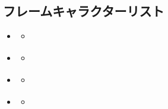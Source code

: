 \documentclass[letterpaper,10pt,dvipdfmx]{sphinxmanual}
\begin{document}
\subsection{フレームキャラクターリスト}
\label{\detokenize{auto/frameActionlist:characterlist-act-frame}}\label{\detokenize{auto/frameActionlist:id85}}
\begin{sphinxShadowBox}
\begin{itemize}
\item {} 
\sphinxAtStartPar
{}\label{\detokenize{auto/frameActionlist:id256}}{\hyperref[\detokenize{auto/frameActionlist:id87}]{}}
\begin{itemize}
\item {} 
\sphinxAtStartPar
{}\label{\detokenize{auto/frameActionlist:id257}}{\hyperref[\detokenize{auto/frameActionlist:char-reanimator}]{}}

\end{itemize}

\item {} 
\sphinxAtStartPar
{}\label{\detokenize{auto/frameActionlist:id258}}{\hyperref[\detokenize{auto/frameActionlist:id89}]{}}
\begin{itemize}
\item {} 
\sphinxAtStartPar
{}\label{\detokenize{auto/frameActionlist:id259}}{\hyperref[\detokenize{auto/frameActionlist:char-darklord}]{}}

\end{itemize}

\item {} 
\sphinxAtStartPar
{}\label{\detokenize{auto/frameActionlist:id260}}{\hyperref[\detokenize{auto/frameActionlist:id91}]{}}
\begin{itemize}
\item {} 
\sphinxAtStartPar
{}\label{\detokenize{auto/frameActionlist:id261}}{\hyperref[\detokenize{auto/frameActionlist:char-chariot}]{}}

\end{itemize}

\item {} 
\sphinxAtStartPar
{}\label{\detokenize{auto/frameActionlist:id262}}{\hyperref[\detokenize{auto/frameActionlist:id93}]{}}
\begin{itemize}
\item {} 
\sphinxAtStartPar
{}\label{\detokenize{auto/frameActionlist:id263}}{\hyperref[\detokenize{auto/frameActionlist:char-giant}]{}}


\end{itemize}
\end{itemize}
\end{sphinxShadowBox}
\end{document}
